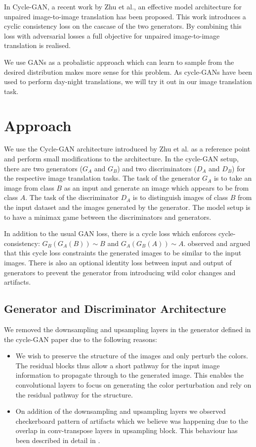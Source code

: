 \documentclass[10pt,twocolumn,letterpaper]{article}
\begin{document}
In Cycle-GAN, a recent work by Zhu et al.\cite{zhu2017unpaired}, an effective model architecture for unpaired image-to-image translation has been proposed. This work introduces a cyclic consistency loss on the cascase of the two generators. By combining this loss with adversarial losses a full objective for unpaired image-to-image translation is realised. 

We use GANs as a probalistic approach which can learn to sample from the desired distribution makes more sense for this problem. As cycle-GANs have been used to perform day-night translations, we will try it out in our image translation task.

\section{Approach}

We use the Cycle-GAN architecture introduced by Zhu et al. \cite{zhu2017unpaired} as a reference point and perform small modifications to the architecture. In the cycle-GAN setup, there are two generators ($G_A$ and $G_B$) and two discriminators ($D_A$ and $D_B$) for the respective image translation tasks. The task of the generator $G_A$ is to take an image from class $B$ as an input and generate an image which appears to be from class $A$. The task of the discriminator $D_A$ is to distinguish images of class $B$ from the input dataset and the images generated by the generator. The model setup is to have a minimax game between the discriminators and generators.

In addition to the usual GAN loss, there is a cycle loss which enforces cycle-consistency: $G_B (G_A (B) ) \sim B$ and $G_A (G_B (A) ) \sim A$. \cite{zhu2017unpaired} observed and argued that this cycle loss constraints the generated images to be similar to the input images. There is also an optional identity loss between input and output of generators to prevent the generator from introducing wild color changes and artifacts.

\subsection{Generator and Discriminator Architecture}
We removed the downsampling and upsampling layers in the generator defined in the cycle-GAN paper due to the following reasons:
\begin{itemize}
    \item We wish to preserve the structure of the images and only perturb the colors. The residual blocks thus allow a short pathway for the input image information to propagate through to the generated image. This enables the convolutional layers to focus on generating the color perturbation and rely on the residual pathway for the structure.
    \item On addition of the downsampling and upsampling layers we observed checkerboard pattern of artifacts which we believe was happening due to the overlap in conv-transpose layers in upsampling block. This behaviour has been described in detail in \cite{zhang2019detecting}.
\end{itemize}
\end{document}
